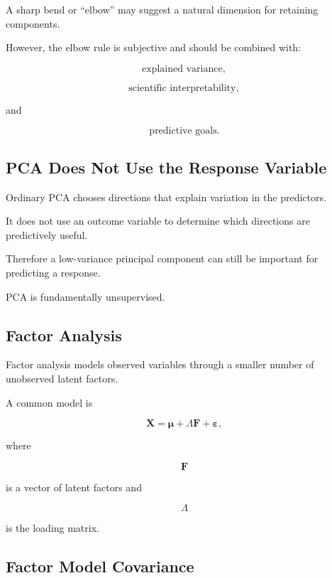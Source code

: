 A sharp bend or ``elbow'' may suggest a natural dimension for retaining
components.

However, the elbow rule is subjective and should be combined with:

\[
\boxed{
\text{explained variance},
}
\]

\[
\boxed{
\text{scientific interpretability},
}
\]

and

\[
\boxed{
\text{predictive goals}.
}
\]

\subsection{PCA Does Not Use the Response Variable}
\label{subsec:pca-unsupervised}

Ordinary PCA chooses directions that explain variation in the predictors.

It does not use an outcome variable to determine which directions are
predictively useful.

Therefore a low-variance principal component can still be important for
predicting a response.

PCA is fundamentally unsupervised.

\subsection{Factor Analysis}
\label{subsec:factor-analysis}

Factor analysis models observed variables through a smaller number of
unobserved latent factors.

A common model is

\[
\boxed{
\mathbf{X}
=
\boldsymbol{\mu}
+
\Lambda\mathbf{F}
+
\boldsymbol{\varepsilon},
}
\]

where

\[
\mathbf{F}
\]

is a vector of latent factors and

\[
\Lambda
\]

is the loading matrix.

\subsection{Factor Model Covariance}
\label{subsec:factor-model-covariance}

